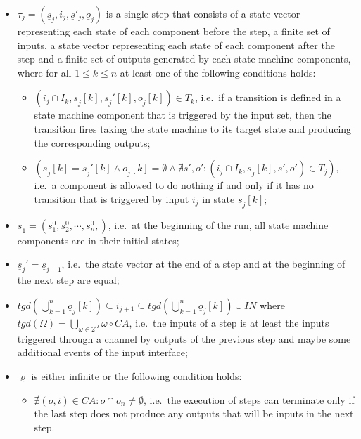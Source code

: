 \documentclass[conference]{IEEEtran}
\begin{document}
\begin{itemize}	
	
	\item $\tau_j = (\underline{s}_j, i_j, \underline{s}'_j, \underline{o}_j)$ is a single step that consists of a state vector representing each state of each component before the step, a finite set of inputs, a state vector representing each state of each component after the step and a finite set of outputs generated by each state machine components, where for all $1 \le k \le n$ at least one of the following conditions holds:
	\begin{itemize}
		\item $(i_j \cap I_k, \underline{s}_j[k], \underline{s}_j'[k], \underline{o}_j[k]) \in T_k$, i.e.~if a transition is defined in a state machine component that is triggered by the input set, then the transition fires taking the state machine to its target state and producing the corresponding outputs;		
		
		\item $ (\underline{s}_j[k] = \underline{s}_j'[k] \land \underline{o}_j[k] = \emptyset \land \nexists s', o':(i_j \cap I_k, \underline{s}_j[k], s', o') \in T_j)$, i.e.~a component is allowed to do nothing if and only if it has no transition that is triggered by input $i_j$ in state $\underline{s}_j[k]$;
	\end{itemize}	
	
	\item $\underline{s}_1 = (s_1^0, s_2^0, \cdots, s_n^0,)$, i.e.~at the beginning of the run, all state machine components are in their initial states;
	
	\item $\underline{s}_j'= \underline{s}_{j + 1}$, i.e.~the state vector at the end of a step and at the beginning of the next step are equal;
	
	\item $\mathit{tgd}(\bigcup_{k=1}^n \underline{o}_j[k]) \subseteq i_{j + 1} \subseteq \mathit{tgd}(\bigcup_{k=1}^n \underline{o}_j[k]) \cup \mathit{IN}$ where $\mathit{tgd}(\Omega) = \bigcup_{\omega \in 2^\Omega} \omega \circ \mathit{CA}$, i.e.~the inputs of a step is at least the inputs triggered through a channel by outputs of the previous step and maybe some additional events of the input interface;
	
	\item $\varrho$ is either infinite or the following condition holds:
	\begin{itemize}
		\item $\nexists (o,i) \in \mathit{CA}\colon o \cap o_n \neq \emptyset$, i.e.~the execution of steps can terminate only if the last step does not produce any outputs that will be inputs in the next step.
	\end{itemize}		
	
\end{itemize}	
\end{document}
